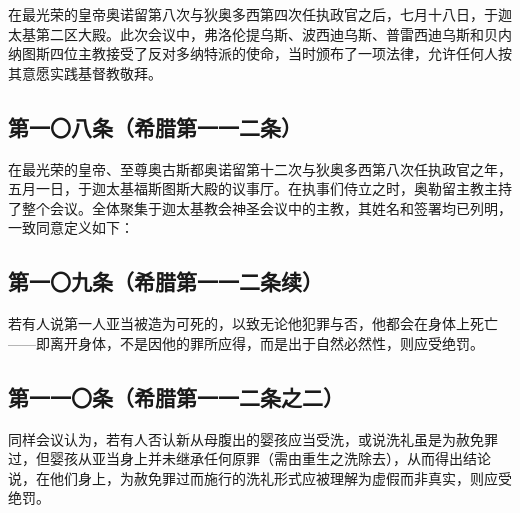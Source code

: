 \par

在最光荣的皇帝奥诺留第八次与狄奥多西第四次任执政官之后，七月十八日，于迦太基第二区大殿。此次会议中，弗洛伦提乌斯、波西迪乌斯、普雷西迪乌斯和贝内纳图斯四位主教接受了反对多纳特派的使命，当时颁布了一项法律，允许任何人按其意愿实践基督教敬拜。\par


\subsection{第一〇八条（希腊第一一二条）}

\par

在最光荣的皇帝、至尊奥古斯都奥诺留第十二次与狄奥多西第八次任执政官之年，五月一日，于迦太基福斯图斯大殿的议事厅。在执事们侍立之时，奥勒留主教主持了整个会议。全体聚集于迦太基教会神圣会议中的主教，其姓名和签署均已列明，一致同意定义如下：\par


\subsection{第一〇九条（希腊第一一二条续）}

\par

若有人说第一人亚当被造为可死的，以致无论他犯罪与否，他都会在身体上死亡——即离开身体，不是因他的罪所应得，而是出于自然必然性，则应受绝罚。\par


\subsection{第一一〇条（希腊第一一二条之二）}

\par

同样会议认为，若有人否认新从母腹出的婴孩应当受洗，或说洗礼虽是为赦免罪过，但婴孩从亚当身上并未继承任何原罪（需由重生之洗除去），从而得出结论说，在他们身上，为赦免罪过而施行的洗礼形式应被理解为虚假而非真实，则应受绝罚。\par

